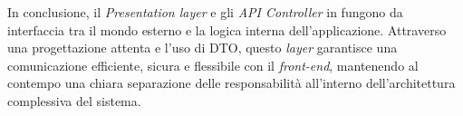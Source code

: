 In conclusione, il \textit{Presentation layer} e gli \textit{API Controller} in {\movi} fungono da interfaccia 
tra il mondo esterno e la logica interna dell'applicazione. Attraverso una progettazione attenta e l'uso di DTO, questo 
\textit{layer} garantisce una comunicazione efficiente, sicura e flessibile con il \textit{front-end}, mantenendo al 
contempo una chiara separazione delle responsabilità all'interno dell'architettura complessiva del sistema.